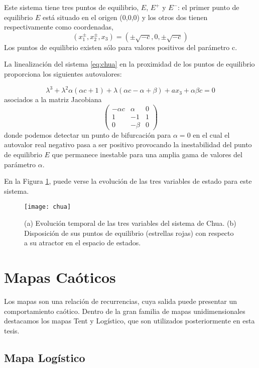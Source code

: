 Este sistema tiene tres puntos de equilibrio, $E$, $E^+$ y $E^-$: el primer punto de equilibrio $E$ está situado en el origen (0,0,0) y los otros dos tienen respectivamente como coordenadas,
\begin{equation}
(x_1^\pm,x_2^\pm,x_3)=\left(\pm \sqrt{-c}, 0,\pm \sqrt{-c}\right) \nonumber
\end{equation}
Los puntos de equilibrio existen sólo para valores positivos del parámetro c.

La linealización del sistema \ref{eq:chua} en la proximidad de los puntos de equilibrio proporciona los siguientes autovalores:

\begin{equation}
\lambda^3 + \lambda^2 \alpha (\alpha c+1)+\lambda(\alpha c-\alpha+\beta)+ax_3+\alpha\beta c=0 \nonumber
\end{equation}
asociados a la matriz Jacobiana
\begin{equation}
\begin{pmatrix}
-\alpha c &\alpha &0 \\
1 &-1 &1 \\
0 &-\beta &0
\end{pmatrix}
\nonumber
\end{equation}
donde podemos detectar un punto de bifurcación para $\alpha=0$ en el cual el autovalor real negativo pasa a ser positivo provocando la inestabilidad del punto de equilibrio $E$ que permanece inestable para una amplia gama de valores del parámetro $\alpha$.

En la Figura \ref{fig:chua}, puede verse la evolución de las tres variables de estado para este sistema.
%
\begin{figure}
\centering\texttt{[image: chua]}
\caption{(a) Evolución temporal de las tres variables del sistema de Chua. (b) Disposición de sus puntos de equilibrio (estrellas rojas) con respecto a su atractor en el espacio de estados.}
\label{fig:chua}
\end{figure}

\section{Mapas Caóticos}

Los mapas son una relación de recurrencias, cuya salida puede presentar un comportamiento caótico. Dentro de la gran familia de mapas unidimensionales destacamos los mapas Tent y Logístico, que son utilizados posteriormente en esta tesis.

\subsection{Mapa Logístico}

